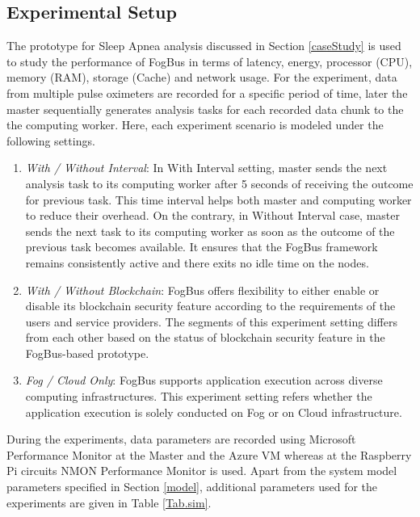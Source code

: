 \documentclass[final,5p,times,twocolumn]{elsarticle}
\begin{document}
\subsection{Experimental Setup}
The prototype for Sleep Apnea analysis discussed in Section \ref{caseStudy} is used to study the performance of FogBus in terms of latency, energy, processor (CPU), memory (RAM), storage (Cache) and network usage. For the experiment, data from multiple pulse oximeters are recorded for a specific period of time, later the master sequentially generates analysis tasks for each recorded data chunk to the the computing worker. Here, each experiment scenario is modeled under the following settings.    
%
\begin{enumerate}
\item \textit{With / Without Interval}: In With Interval setting, master sends the next analysis task to its computing worker after 5 seconds of receiving the outcome for previous task. This time interval helps both master and computing worker to reduce their overhead. On the contrary, in Without Interval case, master sends the next task to its computing worker as soon as the outcome of the previous task becomes available. It ensures that the FogBus framework remains consistently active and there exits no idle time on the nodes. 
\item  \textit{With / Without Blockchain}: FogBus offers flexibility to either enable or disable its blockchain security feature according to the requirements of the users and service providers. The segments of this experiment setting differs from each other based on the status of blockchain security feature in the FogBus-based prototype. 
\item \textit{Fog / Cloud Only}: FogBus supports application execution across diverse computing infrastructures. This experiment setting refers whether the application execution is solely conducted on Fog or on Cloud infrastructure. 
\end{enumerate}
%
During the experiments, data parameters are recorded using Microsoft Performance Monitor at the Master and the Azure VM whereas at the Raspberry Pi circuits NMON Performance Monitor is used. Apart from the system model parameters specified in Section \ref{model}, additional parameters used for the experiments are given in Table \ref{Tab.sim}.    
%
\end{document}
